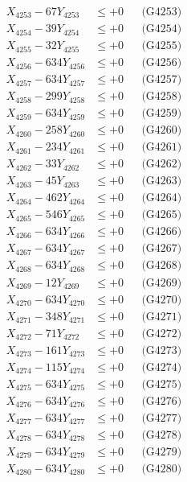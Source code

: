 \documentclass[a4paper,10pt]{article}
\begin{document}
{\begin{align}
X_{4253} - 67Y_{4253} &\leq +0 && \text{(G4253)} \\
X_{4254} - 39Y_{4254} &\leq +0 && \text{(G4254)} \\
X_{4255} - 32Y_{4255} &\leq +0 && \text{(G4255)} \\
X_{4256} - 634Y_{4256} &\leq +0 && \text{(G4256)} \\
X_{4257} - 634Y_{4257} &\leq +0 && \text{(G4257)} \\
X_{4258} - 299Y_{4258} &\leq +0 && \text{(G4258)} \\
X_{4259} - 634Y_{4259} &\leq +0 && \text{(G4259)} \\
X_{4260} - 258Y_{4260} &\leq +0 && \text{(G4260)} \\
\allowbreak
X_{4261} - 234Y_{4261} &\leq +0 && \text{(G4261)} \\
X_{4262} - 33Y_{4262} &\leq +0 && \text{(G4262)} \\
X_{4263} - 45Y_{4263} &\leq +0 && \text{(G4263)} \\
X_{4264} - 462Y_{4264} &\leq +0 && \text{(G4264)} \\
X_{4265} - 546Y_{4265} &\leq +0 && \text{(G4265)} \\
X_{4266} - 634Y_{4266} &\leq +0 && \text{(G4266)} \\
X_{4267} - 634Y_{4267} &\leq +0 && \text{(G4267)} \\
X_{4268} - 634Y_{4268} &\leq +0 && \text{(G4268)} \\
X_{4269} - 12Y_{4269} &\leq +0 && \text{(G4269)} \\
X_{4270} - 634Y_{4270} &\leq +0 && \text{(G4270)} \\
\allowbreak
X_{4271} - 348Y_{4271} &\leq +0 && \text{(G4271)} \\
X_{4272} - 71Y_{4272} &\leq +0 && \text{(G4272)} \\
X_{4273} - 161Y_{4273} &\leq +0 && \text{(G4273)} \\
X_{4274} - 115Y_{4274} &\leq +0 && \text{(G4274)} \\
X_{4275} - 634Y_{4275} &\leq +0 && \text{(G4275)} \\
X_{4276} - 634Y_{4276} &\leq +0 && \text{(G4276)} \\
X_{4277} - 634Y_{4277} &\leq +0 && \text{(G4277)} \\
X_{4278} - 634Y_{4278} &\leq +0 && \text{(G4278)} \\
X_{4279} - 634Y_{4279} &\leq +0 && \text{(G4279)} \\
X_{4280} - 634Y_{4280} &\leq +0 && \text{(G4280)} \\

\end{align}}
\end{document}
